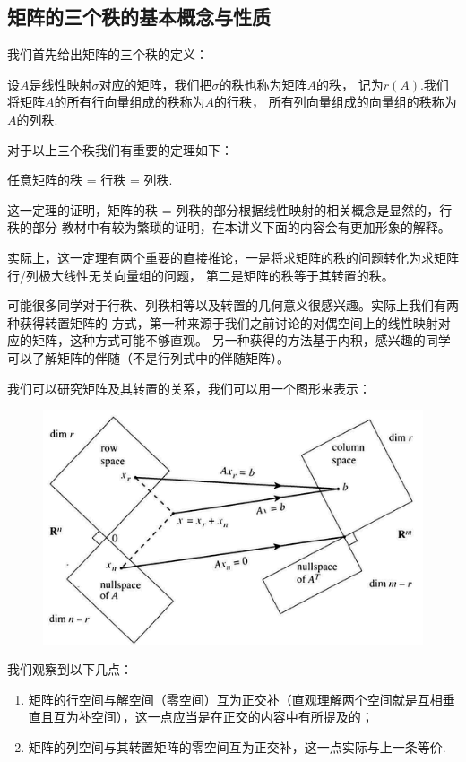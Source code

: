 \subsection{矩阵的三个秩的基本概念与性质}
我们首先给出矩阵的三个秩的定义：
\begin{definition}
	设$A$是线性映射$\sigma$对应的矩阵，我们把$\sigma$的秩也称为矩阵$A$的秩，
	记为$r(A)$.我们将矩阵$A$的所有行向量组成的秩称为$A$的行秩，
	所有列向量组成的向量组的秩称为$A$的列秩.
\end{definition}
对于以上三个秩我们有重要的定理如下：
\begin{theorem}
	任意矩阵的秩 = 行秩 = 列秩.
\end{theorem}
这一定理的证明，矩阵的秩 = 列秩的部分根据线性映射的相关概念是显然的，行秩的部分
教材中有较为繁琐的证明，在本讲义下面的内容会有更加形象的解释。

实际上，这一定理有两个重要的直接推论，一是将求矩阵的秩的问题转化为求矩阵行/列极大线性无关向量组的问题，
第二是矩阵的秩等于其转置的秩。

可能很多同学对于行秩、列秩相等以及转置的几何意义很感兴趣。实际上我们有两种获得转置矩阵的
方式，第一种来源于我们之前讨论的对偶空间上的线性映射对应的矩阵，这种方式可能不够直观。
另一种获得的方法基于内积，感兴趣的同学可以了解矩阵的伴随（不是行列式中的伴随矩阵）。

我们可以研究矩阵及其转置的关系，我们可以用一个图形来表示：
\begin{figure}[h]
	\centering
	\includegraphics[scale=0.5]{5.png}
\end{figure}

我们观察到以下几点：
\begin{enumerate}
	\item 矩阵的行空间与解空间（零空间）互为正交补（直观理解两个空间就是互相垂直且互为补空间），这一点应当是在正交的内容中有所提及的；
	\item 矩阵的列空间与其转置矩阵的零空间互为正交补，这一点实际与上一条等价.
\end{enumerate}

